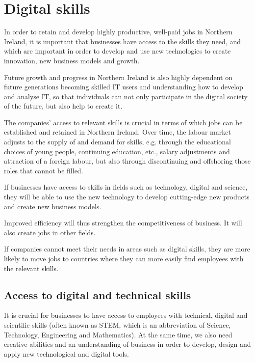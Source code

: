 \chapter{Digital skills}

In order to retain and develop highly productive, well-paid jobs in Northern Ireland, it is important that businesses have access to the skills they need, and which are important in order to develop and use new technologies to create innovation, new business models and growth.

Future growth and progress in Northern Ireland is also highly dependent on future generations becoming skilled IT users and understanding how to develop and analyse IT, so that individuals can not only participate in the digital society of the future, but also help to create it.

The companies' access to relevant skills is crucial in terms of which jobs can be established and retained in Northern Ireland. Over time, the labour market adjusts to the supply of and demand for skills, e.g. through the educational choices of young people, continuing education, etc., salary adjustments and attraction of a foreign labour, but also through discontinuing and offshoring those roles that cannot be filled.

If businesses have access to skills in fields such as technology, digital and science, they will be able to use the new technology to develop cutting-edge new products and create new business models.

Improved efficiency will thus strengthen the competitiveness of business. It will also create jobs in other fields.

If companies cannot meet their needs in areas such as digital skills, they are more likely to move jobs to countries where they can more easily find employees with the relevant skills.

\section{Access to digital and technical skills}

It is crucial for businesses to have access to employees with technical, digital and scientific skills (often known as STEM, which is an abbreviation of Science, Technology, Engineering and Mathematics). At the same time, we also need creative abilities and an understanding of business in order to develop, design and apply new technological and digital tools.

